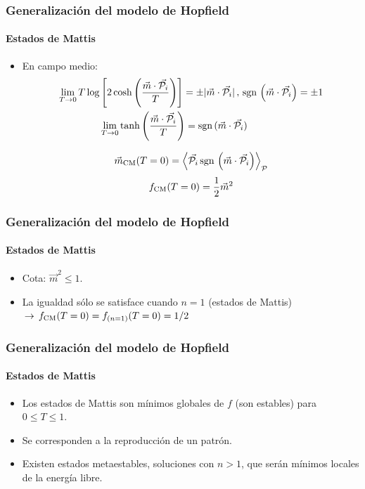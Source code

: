 \documentclass[11pt]{beamer}
\begin{document}
\begin{frame}
\frametitle{Generalización del modelo de Hopfield}
\framesubtitle{Estados de Mattis}
\begin{itemize}
	\item En campo medio:
	\begin{align*}
	\lim_{T\rightarrow0}T\log&\left[2\cosh\left(\frac{\vec{m}\cdot\vec{\mathcal{P}_i}}{T}\right)\right]=\pm|\vec{m}\cdot\vec{\mathcal{P}_i}|\,,\,\textnormal{sgn}\,\left(\vec{m}\cdot\vec{\mathcal{P}_i}\right)=\pm1\\
	&\lim_{T\rightarrow0}\tanh\left(\frac{\vec{m}\cdot\vec{\mathcal{P}_i}}{T}\right)=\textnormal{sgn}\,(\vec{m}\cdot\vec{\mathcal{P}_i})
	\end{align*}
	
	\begin{displaymath}
	\vec{m}_{\textnormal{CM}}(T=0)=\left<\vec{\mathcal{P}_i}\,\textnormal{sgn}\,\left(\vec{m}\cdot\vec{\mathcal{P}_i}\right)\right>_{\mathcal{P}}
	\end{displaymath}
	\begin{displaymath}
	f_{\textnormal{CM}}(T=0)=\frac{1}{2}\vec{m}^2
	\end{displaymath}
\end{itemize}
\end{frame}

\begin{frame}
\frametitle{Generalización del modelo de Hopfield}
\framesubtitle{Estados de Mattis}
\begin{itemize}
	\item Cota: $\vec{m}^2\leq1$.
	\item La igualdad sólo se satisface cuando $n=1$ (estados de Mattis)$\,\rightarrow\,f_{\textnormal{CM}}(T=0)=f_{(n=1)}(T=0)=1/2$
\end{itemize}
\end{frame}

\begin{frame}
\frametitle{Generalización del modelo de Hopfield}
\framesubtitle{Estados de Mattis}
\begin{itemize}
	\item Los estados de Mattis son mínimos globales de $f$ (son estables) para $0\leq T\leq1$.
	\item Se corresponden a la reproducción de un patrón. 
	\item Existen estados metaestables, soluciones con $n>1$, que serán mínimos locales de la energía libre.
\end{itemize}
\end{frame}
\end{document}
